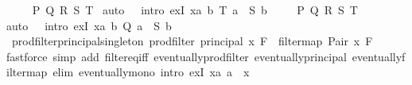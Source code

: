 \begin{isabellebody}
\ \ \isamarkupfalse%
\ \ P\ Q\ R\ S\ T\ \isamarkupfalse%
{\isacharparenleft}{\kern0pt}auto\ {}\ {}\ intro{\isacharcolon}{\kern0pt}\ exI{\isacharbrackleft}{\kern0pt}\ x{\isacharequal}{\kern0pt}{\isachardoublequoteopen}{\isasymlambda}{\isacharparenleft}{\kern0pt}a{\isacharcomma}{\kern0pt}\ b{\isacharparenright}{\kern0pt}{\isachardot}{\kern0pt}\ T\ a\ {\isasymand}\ S\ b{\isachardoublequoteclose}{\isacharbrackright}{\kern0pt}{\isacharparenright}{\kern0pt}\isanewline
\ \ \isamarkupfalse%
\ \ P\ Q\ R\ S\ T\ \isamarkupfalse%
{\isacharparenleft}{\kern0pt}auto\ {}\ {}\ intro{\isacharcolon}{\kern0pt}\ exI{\isacharbrackleft}{\kern0pt}\ x{\isacharequal}{\kern0pt}{\isachardoublequoteopen}{\isasymlambda}{\isacharparenleft}{\kern0pt}a{\isacharcomma}{\kern0pt}\ b{\isacharparenright}{\kern0pt}{\isachardot}{\kern0pt}\ Q\ a\ {\isasymand}\ S\ b{\isachardoublequoteclose}{\isacharbrackright}{\kern0pt}{\isacharparenright}{\kern0pt}\isanewline
\ \ \isamarkupfalse%
%
\endisatagproof
{\isafoldproof}%
%
\isadelimproof
\isanewline
%
\endisadelimproof
\isanewline
{}\isamarkupfalse%
\ prod{\isacharunderscore}{\kern0pt}filter{\isacharunderscore}{\kern0pt}principal{\isacharunderscore}{\kern0pt}singleton{\isacharcolon}{\kern0pt}\ {\isachardoublequoteopen}prod{\isacharunderscore}{\kern0pt}filter\ {\isacharparenleft}{\kern0pt}principal\ {\isacharbraceleft}{\kern0pt}x{\isacharbraceright}{\kern0pt}{\isacharparenright}{\kern0pt}\ F\ {\isacharequal}{\kern0pt}\ filtermap\ {\isacharparenleft}{\kern0pt}Pair\ x{\isacharparenright}{\kern0pt}\ F{\isachardoublequoteclose}\isanewline
%
\isadelimproof
\ \ %
\endisadelimproof
%
\isatagproof
{}\isamarkupfalse%
{\isacharparenleft}{\kern0pt}fastforce\ simp\ add{\isacharcolon}{\kern0pt}\ filter{\isacharunderscore}{\kern0pt}eq{\isacharunderscore}{\kern0pt}iff\ eventually{\isacharunderscore}{\kern0pt}prod{\isacharunderscore}{\kern0pt}filter\ eventually{\isacharunderscore}{\kern0pt}principal\ eventually{\isacharunderscore}{\kern0pt}filtermap\ elim{\isacharcolon}{\kern0pt}\ eventually{\isacharunderscore}{\kern0pt}mono\ intro{\isacharcolon}{\kern0pt}\ exI{\isacharbrackleft}{\kern0pt}\ x{\isacharequal}{\kern0pt}{\isachardoublequoteopen}{\isasymlambda}a{\isachardot}{\kern0pt}\ a\ {\isacharequal}{\kern0pt}\ x{\isachardoublequoteclose}{\isacharbrackright}{\kern0pt}{\isacharparenright}{\kern0pt}%
\endisatagproof
{\isafoldproof}%

\end{isabellebody}
